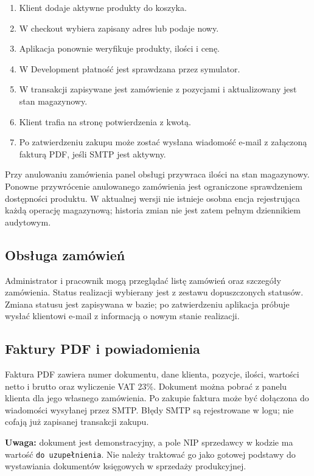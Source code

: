 \documentclass[12pt,a4paper]{article}
\begin{document}
\begin{enumerate}[leftmargin=*]
    \item Klient dodaje aktywne produkty do koszyka.
    \item W checkout wybiera zapisany adres lub podaje nowy.
    \item Aplikacja ponownie weryfikuje produkty, ilości i cenę.
    \item W Development płatność jest sprawdzana przez symulator.
    \item W transakcji zapisywane jest zamówienie z pozycjami i aktualizowany
    jest stan magazynowy.
    \item Klient trafia na stronę potwierdzenia z kwotą.
    \item Po zatwierdzeniu zakupu może zostać wysłana wiadomość e-mail
    z załączoną fakturą PDF, jeśli SMTP jest aktywny.
\end{enumerate}

Przy anulowaniu zamówienia panel obsługi przywraca ilości na stan magazynowy.
Ponowne przywrócenie anulowanego zamówienia jest ograniczone sprawdzeniem
dostępności produktu. W aktualnej wersji nie istnieje osobna encja
rejestrująca każdą operację magazynową; historia zmian nie jest zatem
pełnym dziennikiem audytowym.

\subsection{Obsługa zamówień}
Administrator i pracownik mogą przeglądać listę zamówień oraz szczegóły
zamówienia. Status realizacji wybierany jest z zestawu dopuszczonych statusów.
Zmiana statusu jest zapisywana w bazie; po zatwierdzeniu aplikacja próbuje
wysłać klientowi e-mail z informacją o nowym stanie realizacji.

\subsection{Faktury PDF i powiadomienia}
Faktura PDF zawiera numer dokumentu, dane klienta, pozycje, ilości, wartości
netto i brutto oraz wyliczenie VAT 23\%. Dokument można pobrać z panelu
klienta dla jego własnego zamówienia. Po zakupie faktura może być dołączona
do wiadomości wysyłanej przez SMTP. Błędy SMTP są rejestrowane w logu;
nie cofają już zapisanej transakcji zakupu.

\textbf{Uwaga:} dokument jest demonstracyjny, a pole NIP sprzedawcy w kodzie
ma wartość \texttt{do uzupełnienia}. Nie należy traktować go jako gotowej
podstawy do wystawiania dokumentów księgowych w sprzedaży produkcyjnej.
\end{document}
